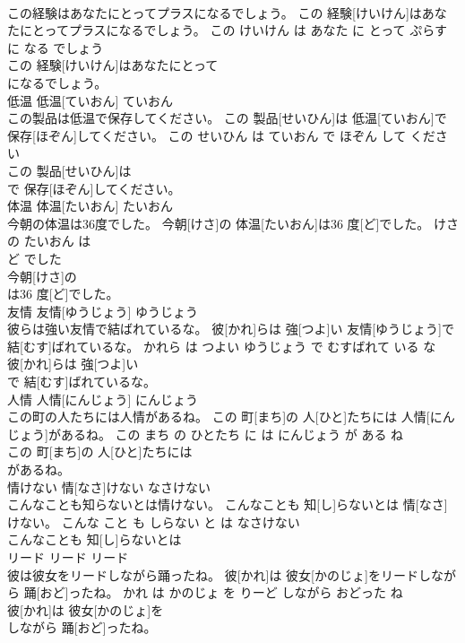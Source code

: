 \documentclass[8pt]{extreport}
\begin{document}
\begin{CJK}{UTF8}{min}
\\	この経験はあなたにとってプラスになるでしょう。	この 経験[けいけん]はあなたにとってプラスになるでしょう。	この けいけん は あなた に とって ぷらす に なる でしょう	
\\	この 経験[けいけん]はあなたにとって
\\	になるでしょう。			
\\	低温	低温[ていおん]	ていおん	
\\	この製品は低温で保存してください。	この 製品[せいひん]は 低温[ていおん]で 保存[ほぞん]してください。	この せいひん は ていおん で ほぞん して ください	
\\	この 製品[せいひん]は
\\	で 保存[ほぞん]してください。			
\\	体温	体温[たいおん]	たいおん	
\\	今朝の体温は36度でした。	今朝[けさ]の 体温[たいおん]は36 度[ど]でした。	けさ の たいおん は 
\\	ど でした	
\\	今朝[けさ]の
\\	は36 度[ど]でした。			
\\	友情	友情[ゆうじょう]	ゆうじょう	
\\	彼らは強い友情で結ばれているな。	彼[かれ]らは 強[つよ]い 友情[ゆうじょう]で 結[むす]ばれているな。	かれら は つよい ゆうじょう で むすばれて いる な	
\\	彼[かれ]らは 強[つよ]い
\\	で 結[むす]ばれているな。			
\\	人情	人情[にんじょう]	にんじょう	
\\	この町の人たちには人情があるね。	この 町[まち]の 人[ひと]たちには 人情[にんじょう]があるね。	この まち の ひとたち に は にんじょう が ある ね	
\\	この 町[まち]の 人[ひと]たちには
\\	があるね。			
\\	情けない	情[なさ]けない	なさけない	
\\	こんなことも知らないとは情けない。	こんなことも 知[し]らないとは 情[なさ]けない。	こんな こと も しらない と は なさけない	
\\	こんなことも 知[し]らないとは
\\	リード	リード	リード	
\\	彼は彼女をリードしながら踊ったね。	彼[かれ]は 彼女[かのじょ]をリードしながら 踊[おど]ったね。	かれ は かのじょ を りーど しながら おどった ね	
\\	彼[かれ]は 彼女[かのじょ]を
\\	しながら 踊[おど]ったね。			

\end{CJK}
\end{document}
